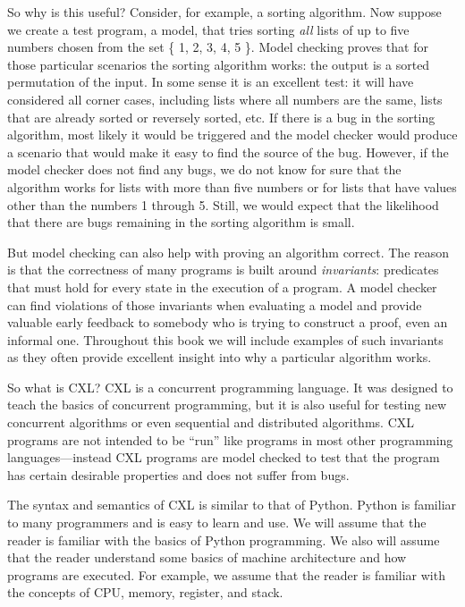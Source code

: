 \documentclass{report}
\begin{document}
So why is this useful?  Consider, for example, a sorting algorithm.
Now suppose we create a test program, a model, that tries sorting
\emph{all} lists of up to five numbers chosen from the set \{ 1,
2, 3, 4, 5 \}.  Model checking proves that for those particular
scenarios the sorting algorithm works: the output is a sorted
permutation of the input.  In some sense it is an excellent test:
it will have considered all corner cases, including lists where all
numbers are the same, lists that are already sorted or reversely
sorted, etc.  If there is a bug in the sorting algorithm, most
likely it would be triggered and the model checker would produce a
scenario that would make it easy to find the source of the bug.
However, if the model checker does not find any bugs, we do not
know for sure that the algorithm works for lists with more than
five numbers or for lists that have values other than the numbers
1 through 5.  Still, we would expect that the likelihood that there
are bugs remaining in the sorting algorithm is small.

But model checking can also help with proving an algorithm correct.
The reason is that the correctness of many programs is built around
\emph{invariants}: predicates that must hold for every state in the
execution of a program.  A model checker can find violations of
those invariants when evaluating a model and provide valuable early
feedback to somebody who is trying to construct a proof, even an
informal one.
Throughout this book we will include examples
of such invariants as they often provide excellent insight into
why a particular algorithm works.

So what is CXL?
CXL is a concurrent programming language.  It was designed to teach
the basics of concurrent programming, but it is also useful for
testing new concurrent algorithms or even sequential and distributed
algorithms.  CXL programs are not intended to be ``run'' like programs
in most other programming languages---instead CXL programs are
model checked to test that the program has certain desirable
properties and does not suffer from bugs.

The syntax and semantics of CXL is similar to that of Python.
Python is familiar to many programmers and is easy to learn and
use.  We will assume that the reader is familiar with the basics
of Python programming.  We also will assume that the reader
understand some basics of machine architecture and how programs
are executed.  For example, we assume that the reader is familiar
with the concepts of CPU, memory, register, and stack.
\end{document}
